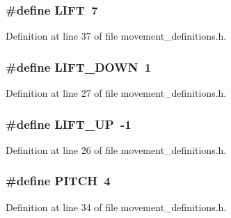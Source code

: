 \subsubsection[{\-L\-I\-F\-T}]{\setlength{\rightskip}{0pt plus 5cm}\#define {\bf \-L\-I\-F\-T}~7}\label{movement__definitions_8h_a87c4281ab0288154c50e55e63f1b5dce}


\-Definition at line 37 of file movement\-\_\-definitions.\-h.

\subsubsection[{\-L\-I\-F\-T\-\_\-\-D\-O\-W\-N}]{\setlength{\rightskip}{0pt plus 5cm}\#define {\bf \-L\-I\-F\-T\-\_\-\-D\-O\-W\-N}~1}\label{movement__definitions_8h_a9aca61b9fb843d370108b53f4058be83}


\-Definition at line 27 of file movement\-\_\-definitions.\-h.

\subsubsection[{\-L\-I\-F\-T\-\_\-\-U\-P}]{\setlength{\rightskip}{0pt plus 5cm}\#define {\bf \-L\-I\-F\-T\-\_\-\-U\-P}~-\/1}\label{movement__definitions_8h_ab1d03fc5bf15953f64274b0bd0648242}


\-Definition at line 26 of file movement\-\_\-definitions.\-h.

\subsubsection[{\-P\-I\-T\-C\-H}]{\setlength{\rightskip}{0pt plus 5cm}\#define {\bf \-P\-I\-T\-C\-H}~4}\label{movement__definitions_8h_acd633835a520a62245ec6cfeb6d00e97}


\-Definition at line 34 of file movement\-\_\-definitions.\-h.

